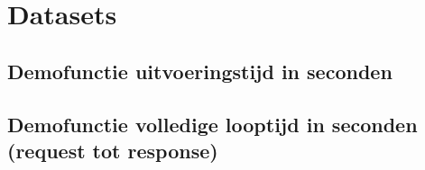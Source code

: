 \section{Datasets}
\subsection{Demofunctie uitvoeringstijd in seconden}
\label{sec:demofunctie-uitvoeringstijd}

\subsection{Demofunctie volledige looptijd in seconden (request tot response)}
\label{sec:demofunctie-volledige-looptijd}